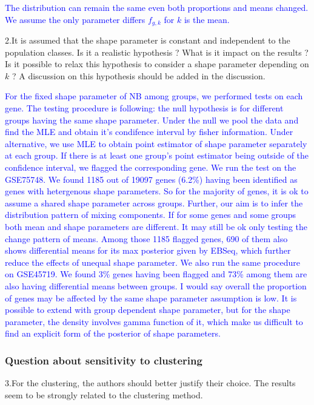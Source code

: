 \documentclass[]{article}
\begin{document}
\textcolor{blue}{The distribution can remain the same even both proportions and means changed. 
We assume the only parameter differs $f_{g,k}$ for $k$ is the mean.}

2.It is assumed that the shape parameter is constant and independent to
the population classes. Is it a realistic hypothesis ? What is it impact
on the results ? Is it possible to relax this hypothesis to consider a
shape parameter depending on \(k\) ? A discussion on this hypothesis
should be added in the discussion.

\textcolor{blue}{For the fixed shape parameter of NB among groups, we performed tests on each gene.
The testing procedure is following: the null hypothesis is for different groups having the same shape parameter. Under the null we pool the data and find the MLE and obtain it's condifence interval by fisher information. Under alternative, we use MLE to obtain point estimator of shape parameter separately at each group. If there is at least one group's point estimator being outside of the confidence interval, we flagged the corresponding gene. We run the test on the GSE75748. We found 1185 out of 19097 genes (6.2\%) having been identified as genes with hetergenous shape parameters. 
So for the majority of genes, it is ok to assume a shared shape parameter across groups.
Further, our aim is to infer the distribution pattern of mixing components. If for some genes and some groups both mean and shape parameters are different. It may still be ok only testing the change pattern of means. Among those 1185 flagged genes, 690 of them also shows differential means for its max posterior given by EBSeq, which further reduce the effects of unequal shape parameter.
We also run the same procedure on GSE45719. We found 3\% genes having been flagged and 73\% among them are also having differential means between groups. I would say overall the proportion of genes may be affected by the same shape parameter assumption is low. It is possible to extend with group dependent shape parameter, but for the shape parameter, the density involves gamma function of it, which make us difficult to find an explicit form of the posterior of shape parameters. 
}

\subsubsection{Question about sensitivity to
clustering}\label{question-about-sensitivity-to-clustering}

3.For the clustering, the authors should better justify their choice.
The results seem to be strongly related to the clustering method.
\end{document}
